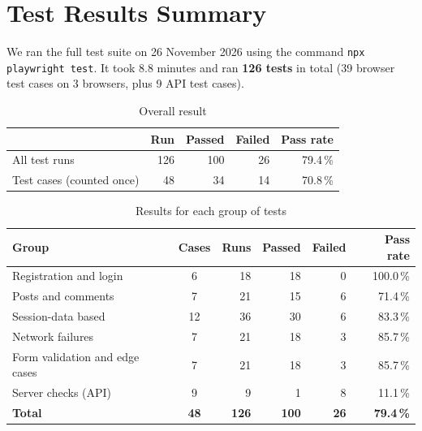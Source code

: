 \documentclass[12pt,a4paper,oneside]{report}
\newcommand{\code}[1]{\texttt{#1}}
\begin{document}
\chapter{Test Results Summary}\label{ch:summary}

We ran the full test suite on 26 November 2026 using the command
\code{npx playwright test}. It took 8.8 minutes and ran \textbf{126 tests} in
total (39 browser test cases on 3 browsers, plus 9 API test cases).

\begin{table}[H]
\centering
\begin{tabular}{lrrrr}
\toprule
 & \textbf{Run} & \textbf{Passed} & \textbf{Failed} & \textbf{Pass rate} \\
\midrule
All test runs & 126 & 100 & 26 & 79.4\,\% \\
Test cases (counted once) & 48 & 34 & 14 & 70.8\,\% \\
\bottomrule
\end{tabular}
\caption{Overall result}
\end{table}

\begin{table}[H]
\centering
\begin{tabular}{lcrrrr}
\toprule
\textbf{Group} & \textbf{Cases} & \textbf{Runs} & \textbf{Passed} & \textbf{Failed} & \textbf{Pass rate} \\
\midrule
Registration and login & 6 & 18 & 18 & 0 & 100.0\,\% \\
Posts and comments & 7 & 21 & 15 & 6 & 71.4\,\% \\
Session-data based & 12 & 36 & 30 & 6 & 83.3\,\% \\
Network failures & 7 & 21 & 18 & 3 & 85.7\,\% \\
Form validation and edge cases & 7 & 21 & 18 & 3 & 85.7\,\% \\
Server checks (API) & 9 & 9 & 1 & 8 & 11.1\,\% \\
\midrule
\textbf{Total} & \textbf{48} & \textbf{126} & \textbf{100} & \textbf{26} & \textbf{79.4\,\%} \\
\bottomrule
\end{tabular}
\caption{Results for each group of tests}
\end{table}
\end{document}
